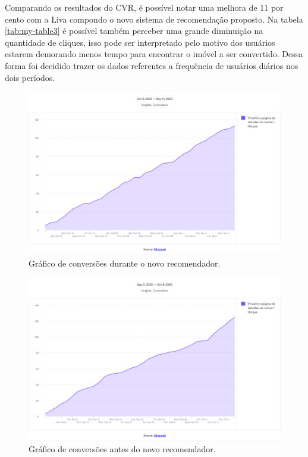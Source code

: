 Comparando os resultados do CVR, é possível notar uma melhora de 11 por cento com a Liva compondo o novo sistema de recomendação proposto. Na tabela \ref{tab:my-table3} é possível também perceber uma grande diminuição na quantidade de cliques, isso pode ser interpretado pelo motivo dos usuários estarem demorando menos tempo para encontrar o imóvel a ser convertido. Dessa forma foi decidido trazer os dados referentes a frequência de usuários diários nos dois períodos.

\begin{figure}[H]
    \centering
    \includegraphics[scale=0.38]{figuras/desenvolvimento/mixpanel-antes.png}
    \caption[Gráfico de conversões durante o novo recomendador]{Gráfico de conversões durante o novo recomendador.}
    \label{fig:mixpanel-antes}
\end{figure}

\begin{figure}[H]
    \centering
    \includegraphics[scale=0.38]{figuras/desenvolvimento/mixpanel-depois.png}
    \caption[Gráfico de conversões antes do novo recomendador]{Gráfico de conversões antes do novo recomendador.}
    \label{fig:mixpanel-depois}
\end{figure}

